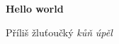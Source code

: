 \documentclass{article}
\begin{document}
{\large\bfseries Hello world}

Příliš žluťoučký \textit{kůň} {\itshape úpěl} 
\end{document}
